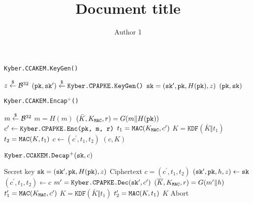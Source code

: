 \documentclass{article}
\title{
    Document title
}
\author{
    Author 1
}
\begin{document}

\begin{algorithm}[H]
    \caption{\texttt{Kyber.CCAKEM.KeyGen()}}\label{alg:ccakem-keygen}
    \begin{algorithmic}[1]
        \State $z \stackrel{\$}{\leftarrow} \mathcal{B}^{32}$
        \State $(\texttt{pk}, \texttt{sk}^\prime) \stackrel{\$}{\leftarrow} \texttt{Kyber.CPAPKE.KeyGen()}$
        \State $\texttt{sk} = (\texttt{sk}^\prime, \texttt{pk}, H(\texttt{pk}), z)$
        \State \Return $(\texttt{pk}, \texttt{sk})$
    \end{algorithmic}
\end{algorithm}

\begin{algorithm}[H]
    \caption{\texttt{Kyber.CCAKEM.Encap$^+$(\pk)}}\label{alg:ccakem-encap+}
    \begin{algorithmic}[1]
        \State $m \stackrel{\$}{\leftarrow} \mathcal{B}^{32}$
        \State $m = H(m)$
        \State $(\bar{K}, K_{\texttt{MAC}}, r) = G(m \Vert H(\texttt{pk}))$
        \State $c^\prime  \leftarrow \texttt{Kyber.CPAPKE.Enc(\texttt{pk}, m, r)}$
            \State $t_1 = \texttt{MAC}(K_{\texttt{MAC}}, c^\prime)$
        \State $K = \texttt{KDF}(\bar{K} \Vert t_1)$
        \State $t_2=\texttt{MAC}(K, t_1)$
        \State $c \leftarrow (c^\prime, t_1, t_2)$
        \State \Return $(c, K)$
    \end{algorithmic}
\end{algorithm}

\begin{algorithm}[H]
    \caption{$\texttt{Kyber.CCAKEM.Decap}^+ (\texttt{sk}, c)$}\label{alg:ccakem-decap+}
    \begin{algorithmic}[1]
        \Require Secret key $\texttt{sk} = (\texttt{sk}^\prime, \texttt{pk}, H(\texttt{pk}), z)$
        \Require Ciphertext $c = (c^\prime, t_1, t_2)$
        \State $(\texttt{sk}^\prime, \texttt{pk}, h, z) \leftarrow \texttt{sk}$
        \State $(c^\prime, t_1, t_2) \leftarrow c$
        \State $m^\prime = \texttt{Kyber.CPAPKE.Dec}(\texttt{sk}^\prime, c^\prime)$ 
        \State $(\overline{K},  K_{\texttt{MAC}}, r) =   G(m^\prime \Vert h)$
        \State $t_1^\prime=\texttt{MAC}(K_{\texttt{MAC}}, c^\prime)$
            \State $K  = \texttt{KDF}(\bar{K} \Vert t_1)$ 
            \State $t_2'= \texttt{MAC}(K, t_1)$
        \EndIf
            \State \Return $K$
        \Else
            \State Abort
        \EndIf
    \end{algorithmic}
\end{algorithm}
\end{document}
